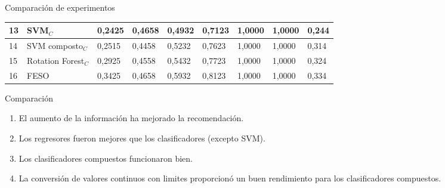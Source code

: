 \begin{frame}
\begin{block}{Comparación de experimentos}
\begin{table}[!htp]
\begin{tabular}{|l|l|l|l|l|l|l|l|l|}
\rowcolor{amarelo}	13 & SVM\(_C\)    			& 0,2425 & 0,4658 & 0,4932 & 0,7123 & 1,0000 & 1,0000 & 0,244 \\ \hline
\rowcolor{azul}		14 & SVM composto\(_C\)		& 0,2515 & 0,4458 & 0,5232 & 0,7623 & 1,0000 & 1,0000 & 0,314 \\ \hline
\rowcolor{azul}		15 & Rotation Forest\(_C\)  & 0,2925 & 0,4558 & 0,5432 & 0,7723 & 1,0000 & 1,0000 & 0,324 \\ \hline
\rowcolor{vermelho}	16 & FESO          			& 0,3425 & 0,4658 & 0,5932 & 0,8123 & 1,0000 & 1,0000 & 0,334 \\ \hline
			\end{tabular}
		\end{table}
		\egroup
		
	\end{block}
\end{frame}


\begin{frame}
	\begin{block}{Comparación}
		\begin{enumerate}
			\item El aumento de la información ha mejorado la recomendación.
			\item Los regresores fueron mejores que los clasificadores (excepto SVM).
			\item Los clasificadores compuestos funcionaron bien.
			\item La conversión de valores continuos con limites proporcionó un buen rendimiento para los clasificadores compuestos.
		\end{enumerate}
		
	\end{block}
\end{frame}

